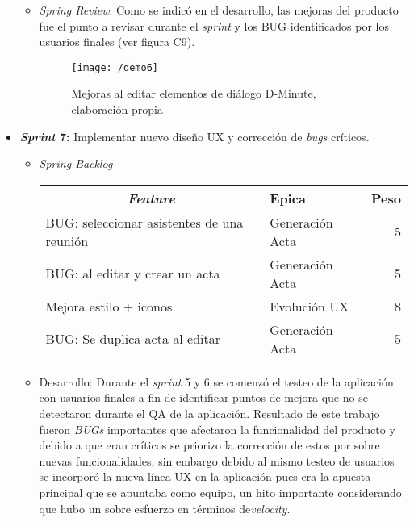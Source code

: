 \begin{itemize}
\begin{itemize}
\item \textit{Spring Review}: Como se indicó en el desarrollo, las mejoras del producto fue el punto a revisar durante el \textit{sprint} y los BUG identificados por los usuarios finales (ver figura C9).

\begin{figure}[!h]
\centering
\texttt{[image: /demo6]}
\label{imga-c6}
\caption{Mejoras al editar elementos de diálogo D-Minute, elaboración propia}
\end{figure}

\end{itemize}	

	\item \textbf{\textit{Sprint} 7:} Implementar nuevo diseño UX y corrección de \textit{bugs} críticos. 

\begin{itemize}
\item \textit{Spring Backlog}

\begin{table}[!h]
\centering
\label{tab:backlog7}
\begin{tabular}{|l|l|r|}
\hline
\multicolumn{1}{|c|}{\textit{\textbf{Feature}}} & \textbf{Epica} & \textbf{Peso} \\ \hline
BUG: seleccionar asistentes de una reunión & Generación Acta & 5 \\ \hline
BUG: al editar y crear un acta & Generación Acta & 5 \\ \hline
Mejora estilo + iconos & Evolución UX & 8 \\ \hline
BUG: Se duplica acta al editar & Generación Acta & 5 \\ \hline
\end{tabular}
\end{table}


\item Desarrollo: Durante el \textit{sprint} 5 y 6 se comenzó el testeo de la aplicación con usuarios finales a fin de identificar puntos de mejora que no se detectaron durante el QA de la aplicación. Resultado de este trabajo fueron \textit{BUGs} importantes que afectaron la funcionalidad del producto y debido a que eran críticos se priorizo la corrección de estos por sobre nuevas funcionalidades, sin embargo debido al mismo testeo de usuarios se incorporó la nueva línea UX en la aplicación pues era la apuesta principal que se apuntaba como equipo, un hito importante considerando que hubo un sobre esfuerzo en términos de\textit{velocity}. 


\end{itemize}
\end{itemize}
